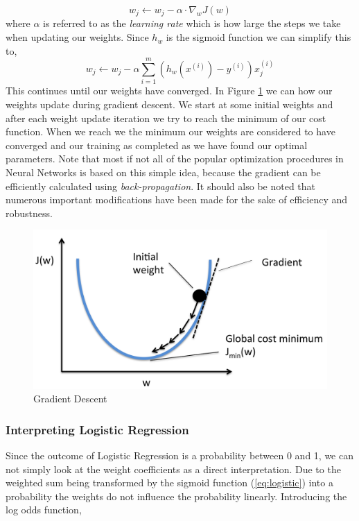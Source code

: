 \begin{equation}
w_{j} \longleftarrow w_{j} - \alpha \cdot \nabla_{w}J(w)
\end{equation}
where $\alpha$ is referred to as the \emph{learning rate} which is how large the steps we take when updating our weights. Since $h_{w}$ is the sigmoid function we can simplify this to, 
\begin{equation}
    w_{j} \longleftarrow w_{j} - \alpha \sum_{i=1}^{m}(h_{w}(x^{(i)}) - y^{(i)})x_{j}^{(i)}
\end{equation}
This continues until our weights have converged.
In Figure \ref{fig-gradient-descent} we can how our weights update during gradient descent. We start at some initial weights and after each weight update iteration we try to reach the minimum of our cost function. When we reach we the minimum our weights are considered to have converged and our training as completed as we have found our optimal parameters. Note that most if not all of the popular optimization procedures in Neural Networks is based on this simple idea, because the gradient can be efficiently calculated using \emph{back-propagation}. It should also be noted that numerous important modifications have been made for the sake of efficiency and robustness.
\begin {figure}[!htpb]
\centering
  \includegraphics[width=\linewidth]{Credit_Images/GradientDescent.png}
   \caption{Gradient Descent \cite{GradientDescent}}
    \label{fig-gradient-descent}
\end{figure}

\subsubsection{Interpreting Logistic Regression} \label{sect:interpreting-logistic-regression}
Since the outcome of Logistic Regression is a probability between 0 and 1, we can not simply look at the weight coefficients as a direct interpretation. Due to the weighted sum being transformed by the sigmoid function (\ref{eq:logistic}) into a probability the weights do not influence the probability linearly. Introducing the log odds function,

